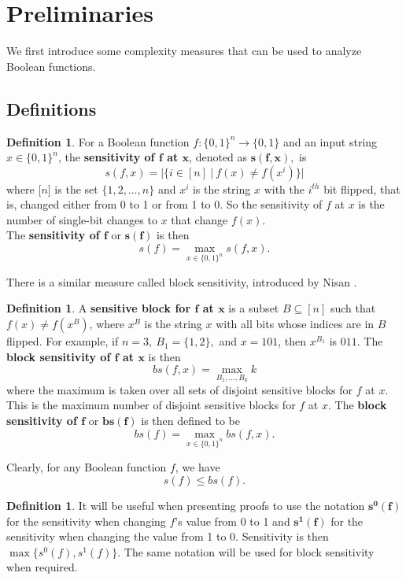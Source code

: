 \documentclass[psamsfonts]{amsart}
\theoremstyle{definition}
\newtheorem{defn}[theorem]{Definition}
\theoremstyle{remark}
\numberwithin{equation}{section}
\begin{document}
	\section{Preliminaries}
		We first introduce some complexity measures that can be used to analyze Boolean functions.

	\subsection{Definitions}
\begin{defn}\label{sensitivity}
For a Boolean function $f: \{0,1\}^n \to \{0,1\}$ and an input string $x \in \{0,1\}^{n}$, the \textbf{sensitivity of $\boldsymbol{f}$ at $\boldsymbol{x}$}, denoted as $\boldsymbol{s(f,x)},$ is $$s(f,x) =|\{i \in [n] \: | \: f(x) \neq f(x^{i})\}|$$ where 
$\lbrack n \rbrack$ is the set 
$\{1,2,\ldots ,n\}$ and 
$x^{i}$ is the string $x$ with the $i^{th}$ bit flipped, 
that is, changed either from 0 to 1 or from 1 to 0.  So the sensitivity of $f$ at $x$ is the number of single-bit changes to $x$ that change $f(x)$.  
\\
The \textbf{sensitivity of $\boldsymbol{f}$} or $\boldsymbol{s(f)}$ is then $$s(f) = \max\limits_{x \in \{0,1\}^{n}} s(f,x).$$
\end{defn}

There is a similar measure called block sensitivity, introduced by Nisan \cite{N}.  
\begin{defn}\label{blocksensitivity}
A \textbf{sensitive block for $\boldsymbol{f}$ at $\boldsymbol{x}$} is a subset $B \subseteq [n]$ such that 
$f(x) \neq f(x^{B})$, where $x^{B}$ is the string $x$ with all bits whose indices are in $B$ flipped.
For example, if $n=3, \: B_{1} = \{1,2\},$ and $x=101$, then $x^{B_{1}}$ is $011$.  
The \textbf{block sensitivity of $\boldsymbol{f}$ at $\boldsymbol{x}$} is then
$$bs(f,x) = \max_{B_{1}, \ldots , B_{k}} k$$ 
where the maximum is taken over all sets of disjoint sensitive blocks for $f$ at $x$.  This is the maximum number of disjoint sensitive blocks for $f$ at $x$.
The \textbf{block sensitivity of $\boldsymbol{f}$} or $\boldsymbol{bs(f)}$ is then defined to be
$$bs(f) = \max\limits_{x \in \{0,1\}^{n}} bs(f,x).$$
\end{defn}

Clearly, for any Boolean function $f$, we have 
		\begin{equation}
			s(f) \leq bs(f). \nonumber
		\end{equation}
		

\begin{defn}\label{oneandzero}
It will be useful when presenting proofs to use the notation $\boldsymbol{s^{0}(f)}$ for the sensitivity when changing $f$'s value from 0 to 1 
and $\boldsymbol{s^{1}(f)}$ for the sensitivity when changing 
the value from 1 to 0.  Sensitivity is then $\max \{ s^{0}(f), s^{1}(f)\}$.  The same notation will be used for block sensitivity when required.  
\end{defn}
\end{document}
